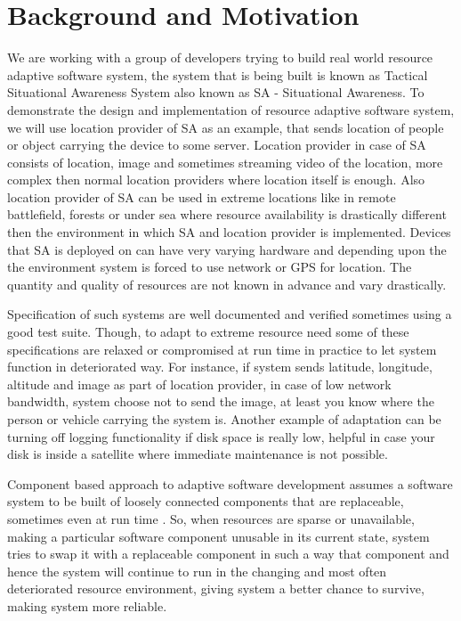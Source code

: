 \section{Background and Motivation}

We are working with a group of developers trying to build real world resource adaptive software system, the system that is being built is known as Tactical Situational Awareness System also known as SA - Situational Awareness. To demonstrate the design and implementation of resource adaptive software system, we will use location provider of SA as an example, that sends location of people or object carrying the device to some server. Location provider in case of SA consists of location, image and sometimes streaming video of the location, more complex then normal location providers where location itself is enough. Also location provider of SA can be used in extreme locations like in remote battlefield, forests or under sea where resource availability is drastically different then the environment in which SA and location provider is implemented. Devices that SA is deployed on can have very varying hardware and depending upon the the environment system is forced to use network or GPS for location. The quantity and quality of resources are not known in advance and vary drastically.

Specification of such systems are well documented and verified sometimes using a good test suite. Though, to adapt to extreme resource need some of these specifications are relaxed or compromised at run time in practice to let system function in deteriorated way. For instance, if system sends latitude, longitude, altitude and image as part of location provider, in case of low network bandwidth, system choose not to send the image, at least you know where the person or vehicle carrying the system is. Another example of adaptation can be turning off logging functionality if disk space is really low, helpful in case your disk is inside a satellite where immediate maintenance is not possible.

Component based approach to adaptive software development assumes a software system to be built of loosely connected components that are replaceable, sometimes even at run time \cite{architectureBasedAdaptation}. So, when resources are sparse or unavailable, making a particular software component unusable in its current state, system tries to swap it with a replaceable component in such a way that component and hence the system will continue to run in the changing and most often deteriorated resource environment, giving system a better chance to survive, making system more reliable.

